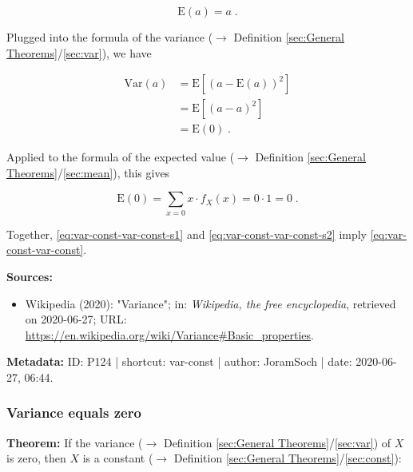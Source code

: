 \documentclass[a4paper,12pt,twoside]{book}
\begin{document}
\begin{equation} \label{eq:var-const-mean-const}
\mathrm{E}(a) = a \; .
\end{equation}

Plugged into the formula of the variance ($\rightarrow$ Definition \ref{sec:General Theorems}/\ref{sec:var}), we have

\begin{equation} \label{eq:var-const-var-const-s1}
\begin{split}
\mathrm{Var}(a) &= \mathrm{E}\left[ (a-\mathrm{E}(a))^2 \right] \\
&= \mathrm{E}\left[ (a-a)^2 \right] \\
&= \mathrm{E}(0) \; .
\end{split}
\end{equation}

Applied to the formula of the expected value ($\rightarrow$ Definition \ref{sec:General Theorems}/\ref{sec:mean}), this gives

\begin{equation} \label{eq:var-const-var-const-s2}
\mathrm{E}(0) = \sum_{x=0} x \cdot f_X(x) = 0 \cdot 1 = 0 \; .
\end{equation}

Together, \eqref{eq:var-const-var-const-s1} and \eqref{eq:var-const-var-const-s2} imply \eqref{eq:var-const-var-const}.



\vspace{1em}
\textbf{Sources:}
\begin{itemize}
\item Wikipedia (2020): "Variance"; in: \textit{Wikipedia, the free encyclopedia}, retrieved on 2020-06-27; URL: \url{https://en.wikipedia.org/wiki/Variance#Basic_properties}.
\end{itemize}


\vspace{1em}
\textbf{Metadata:} ID: P124 | shortcut: var-const | author: JoramSoch | date: 2020-06-27, 06:44.
\vspace{1em}



\subsubsection[\textbf{Variance equals zero}]{Variance equals zero} \label{sec:var-zero}
\setcounter{equation}{0}

\textbf{Theorem:} If the variance ($\rightarrow$ Definition \ref{sec:General Theorems}/\ref{sec:var}) of $X$ is zero, then $X$ is a constant ($\rightarrow$ Definition \ref{sec:General Theorems}/\ref{sec:const}):
\end{document}
